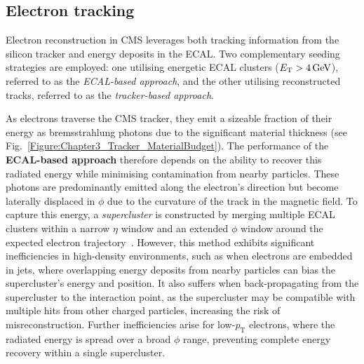 \subsection{Electron tracking}
\label{Section:Chapter4_ElectronTracking}
Electron reconstruction in CMS leverages both tracking information from the silicon tracker and energy deposits in the ECAL. Two complementary seeding strategies are employed: one utilising energetic ECAL clusters ($E_\mathrm{T} > 4\,\text{Ge\hspace{-.08em}V}$), referred to as the \textit{ECAL-based approach}, and the other utilising reconstructed tracks, referred to as the \textit{tracker-based approach}.

As electrons traverse the CMS tracker, they emit a sizeable fraction of their energy as bremsstrahlung photons due to the significant material thickness (see Fig.~\ref{Figure:Chapter3_Tracker_MaterialBudget}). The performance of the \textbf{ECAL-based approach} therefore depends on the ability to recover this radiated energy while minimising contamination from nearby particles. These photons are predominantly emitted along the electron’s direction but become laterally displaced in $\phi$ due to the curvature of the track in the magnetic field. To capture this energy, a \textit{supercluster} is constructed by merging multiple ECAL clusters within a narrow $\eta$ window and an extended $\phi$ window around the expected electron trajectory~\cite{ParticleFlow}. However, this method exhibits significant inefficiencies in high-density environments, such as when electrons are embedded in jets, where overlapping energy deposits from nearby particles can bias the supercluster’s energy and position. It also suffers when back-propagating from the supercluster to the interaction point, as the supercluster may be compatible with multiple hits from other charged particles, increasing the risk of misreconstruction. Further inefficiencies arise for low-$p_\mathrm{T}$ electrons, where the radiated energy is spread over a broad $\phi$ range, preventing complete energy recovery within a single supercluster.

